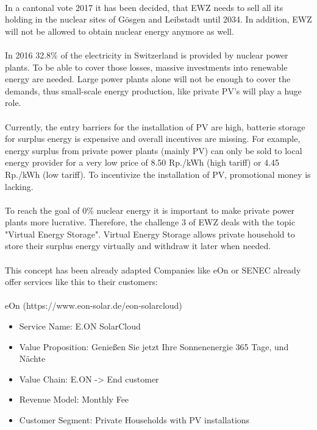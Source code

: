 \documentclass{scrartcl}
\begin{document}
    \paragraph{}
    In a cantonal vote 2017 it has been decided, that EWZ needs to sell all its holding in the nuclear sites of Gösgen and Leibstadt until 2034. In addition, EWZ will not be allowed to obtain nuclear energy anymore as well. 
    \paragraph{}
    In 2016 32.8\% of the electricity in Switzerland is provided by nuclear power plants.  To be able to cover those losses, massive investments into renewable energy are needed. Large power plants alone will not be enough to cover the demands, thus small-scale energy production, like private PV's will play a huge role. 
    \paragraph{}
    Currently, the entry barriers for the installation of PV are high, batterie storage for surplus energy is expensive and overall incentives are missing. For example, energy surplus from private power plants (mainly PV) can only be sold to local energy provider for a very low price of 8.50 Rp./kWh (high tariff) or 4.45 Rp./kWh (low tariff).  To incentivize the installation of PV, promotional money is lacking.   
    \paragraph{}
    To reach the goal of 0\% nuclear energy it is important to make private power plants more lucrative. Therefore, the challenge 3 of EWZ deals with the topic "Virtual Energy Storage". Virtual Energy Storage allows private household to store their surplus energy virtually and withdraw it later when needed. 
    \paragraph{}
    This concept has been already adapted   Companies like eOn or SENEC already offer services like this to their customers:
    \paragraph{}
    eOn (https://www.eon-solar.de/eon-solarcloud)
\begin{itemize}
\item Service Name: 		E.ON SolarCloud
\item Value Proposition: 	Genießen Sie jetzt Ihre Sonnenenergie 365 Tage, und Nächte
\item Value Chain:		E.ON -> End customer
\item Revenue Model: 	Monthly Fee
\item Customer Segment:	Private Households with PV installations
\end{itemize}
\end{document}
